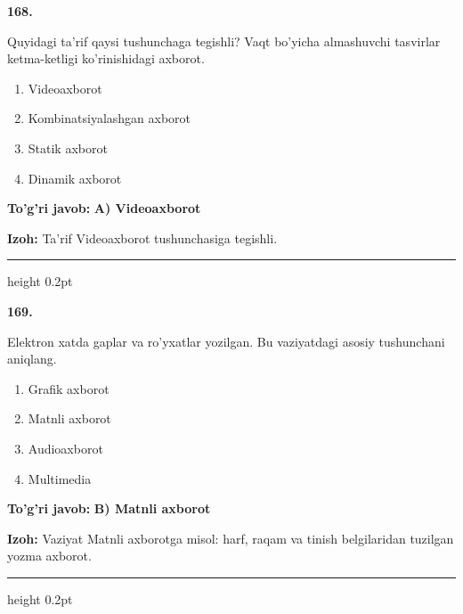\documentclass[10pt,a4paper,oneside]{article}
\begin{document}
\noindent\textbf{\color{ink}168.}
\par
Quyidagi ta'rif qaysi tushunchaga tegishli? Vaqt bo'yicha almashuvchi tasvirlar ketma-ketligi ko'rinishidagi axborot.
\begin{enumerate}[label=\Alph*),leftmargin=9mm]
\item Videoaxborot
\item Kombinatsiyalashgan axborot
\item Statik axborot
\item Dinamik axborot
\end{enumerate}
\begin{tcolorbox}[enhanced,breakable,colback=teal!4,colframe=teal!50!black,boxrule=0.5pt,arc=1.1mm,left=3mm,right=3mm,top=1.7mm,bottom=1.7mm,before skip=2mm,after skip=2mm]
\textbf{\color{teal}To'g'ri javob:} \textbf{A) Videoaxborot}
\par\smallskip
\textbf{Izoh:} Ta'rif Videoaxborot tushunchasiga tegishli.
\end{tcolorbox}
\vspace{2mm}\hrule height 0.2pt \vspace{3mm}

\noindent\textbf{\color{ink}169.}
\par
Elektron xatda gaplar va ro'yxatlar yozilgan. Bu vaziyatdagi asosiy tushunchani aniqlang.
\begin{enumerate}[label=\Alph*),leftmargin=9mm]
\item Grafik axborot
\item Matnli axborot
\item Audioaxborot
\item Multimedia
\end{enumerate}
\begin{tcolorbox}[enhanced,breakable,colback=teal!4,colframe=teal!50!black,boxrule=0.5pt,arc=1.1mm,left=3mm,right=3mm,top=1.7mm,bottom=1.7mm,before skip=2mm,after skip=2mm]
\textbf{\color{teal}To'g'ri javob:} \textbf{B) Matnli axborot}
\par\smallskip
\textbf{Izoh:} Vaziyat Matnli axborotga misol: harf, raqam va tinish belgilaridan tuzilgan yozma axborot.
\end{tcolorbox}
\vspace{2mm}\hrule height 0.2pt \vspace{3mm}
\end{document}
